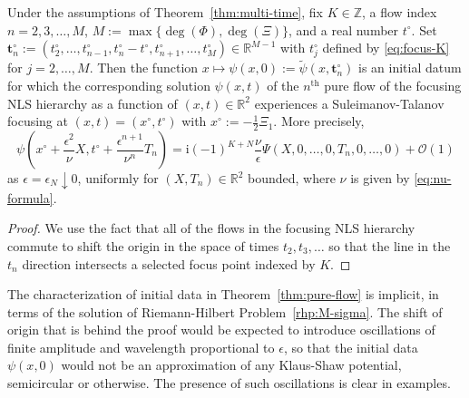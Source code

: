 \documentclass[12pt]{amsart}
\numberwithin{equation}{section}
\newcommand{\ii}{\mathrm{i}}
\newcommand{\phaseint}{\Phi}
\newcommand{\tailint}{\Xi}
\newcommand{\eps}{\epsilon}
\newcommand{\bigo}[1]{ \mathcal{O}\! \left( #1 \right) }
\begin{document}
\begin{thm}
Under the assumptions of Theorem~\ref{thm:multi-time}, fix $K\in\mathbb{Z}$, a flow index $n=2,3,\dots,M$, $M:=\max\{\deg(\phaseint),\deg(\tailint)\}$, and a real number $t^\circ$.   Set $\mathbf{t}_n^\circ:=(t_2^\circ,\dots,t_{n-1}^\circ,t_n^\circ-t^\circ,t_{n+1}^\circ,\dots,t_M^\circ)\in\mathbb{R}^{M-1}$ with $t_j^\circ$ defined by \eqref{eq:focus-K} for $j=2,\dots,M$.  Then the function $x\mapsto \psi(x,0):=\widetilde{\psi}(x,\mathbf{t}_n^\circ)$ is an initial datum 
for which the corresponding solution $\psi(x,t)$ of the $n^\mathrm{th}$ pure flow of the focusing NLS hierarchy as a function of $(x,t)\in\mathbb{R}^2$ experiences a Suleimanov-Talanov focusing at $(x,t)=(x^\circ,t^\circ)$ with $x^\circ:=-\frac{1}{2}\tailint_1$.  More precisely,
\begin{equation}
\psi\left(x^\circ+\frac{\epsilon^2}{\nu}X,t^\circ+\frac{\epsilon^{n+1}}{\nu^n}T_n\right)=\ii (-1)^{K+N}\frac{\nu}{\epsilon}\Psi(X,0,\dots,0,T_n,0,\dots,0)+\bigo{1}
\end{equation}
as $\epsilon=\epsilon_N\downarrow 0$, uniformly for $(X,T_n)\in\mathbb{R}^2$ bounded, where $\nu$ is given by \eqref{eq:nu-formula}.
\label{thm:pure-flow}
\end{thm}

\begin{proof}
We use the fact that all of the flows in the focusing NLS hierarchy commute to shift the origin in the space of times $t_2,t_3,\dots$ so that the line in the $t_n$ direction intersects a selected focus point indexed by $K$.
\end{proof}

\begin{rem}
The characterization of initial data in Theorem~\ref{thm:pure-flow} is implicit, in terms of the solution of Riemann-Hilbert Problem~\ref{rhp:M-sigma}.  The shift of origin that is behind the proof would be expected to introduce oscillations of finite amplitude and wavelength proportional to $\eps$, so that the initial data $\psi(x,0)$ would not be an approximation of any Klaus-Shaw potential, semicircular or otherwise.  The presence of such oscillations is clear in examples.
\label{rem:non-Madelung}
\end{rem}
\end{document}
